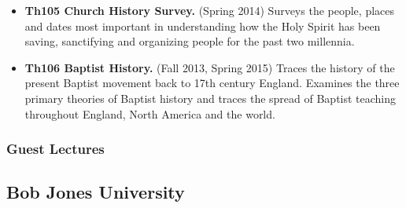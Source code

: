 {\begin{itemize}
\itemsep1pt\parskip0pt
\item
  \textbf{Th105 Church History Survey.} (Spring 2014) Surveys the people, places and dates most important in understanding how the Holy Spirit has been saving, sanctifying and organizing people for the past two millennia.
\item
  \textbf{Th106 Baptist History.} (Fall 2013, Spring 2015) Traces the history of the present Baptist movement back to 17th century England. Examines the three primary theories of Baptist history and traces the spread of Baptist teaching throughout England, North America and the world.
\end{itemize}

\subsubsection{Guest Lectures}\label{guest-lectures}

}
\subsection{Bob Jones University}\label{bob-jones-university}


